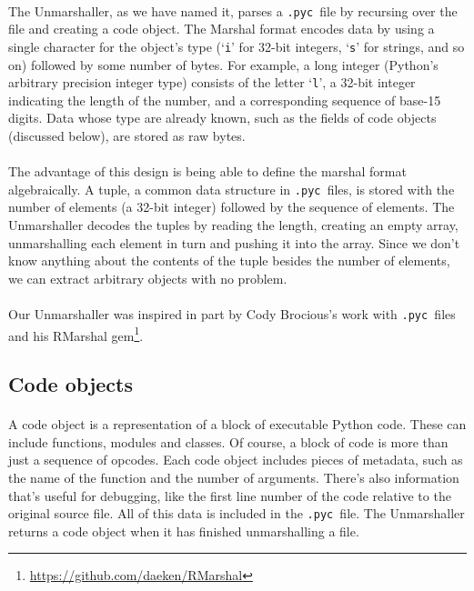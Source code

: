 \documentclass{article}
\newcommand{\pyc}{\texttt{.pyc~}}
\begin{document}
\paragraph{}
The Unmarshaller, as we have named it, parses a \pyc file by recursing over the file and creating a code object. The Marshal format encodes data by using a single character for the object's type (`\texttt{i}' for 32-bit integers, `\texttt{s}' for strings, and so on) followed by some number of bytes. For example, a long integer (Python's arbitrary precision integer type) consists of the letter `\texttt{l}', a 32-bit integer indicating the length of the number, and a corresponding sequence of base-15 digits. Data whose type are already known, such as the fields of code objects (discussed below), are stored as raw bytes.

\paragraph{}
The advantage of this design is being able to define the marshal format algebraically. A tuple, a common data structure in \pyc files, is stored with the number of elements (a 32-bit integer) followed by the sequence of elements. The Unmarshaller decodes the tuples by reading the length, creating an empty array, unmarshalling each element in turn and pushing it into the array. Since we don't know anything about the contents of the tuple besides the number of elements, we can extract arbitrary objects with no problem.

\paragraph{}
Our Unmarshaller was inspired in part by Cody Brocious's work with \pyc files and his RMarshal gem\footnote{\url{https://github.com/daeken/RMarshal}}.

\subsection{Code objects}\label{code object}

\paragraph{}
A code object is a representation of a block of executable Python code. These can include functions, modules and classes. Of course, a block of code is more than just a sequence of opcodes. Each code object includes pieces of metadata, such as the name of the function and the number of arguments. There's also information that's useful for debugging, like the first line number of the code relative to the original source file. All of this data is included in the \pyc file. The Unmarshaller returns a code object when it has finished unmarshalling a file.
\end{document}
